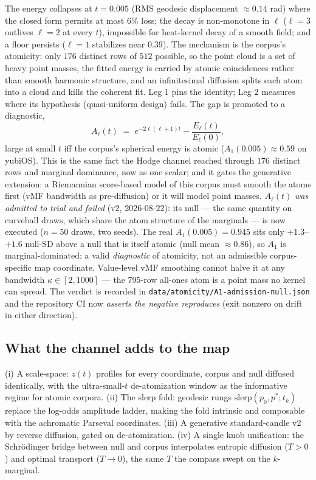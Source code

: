 \documentclass[11pt,a4paper]{article}
\theoremstyle{plain}
\theoremstyle{remark}
\begin{document}
The energy collapses at $t=0.005$ (RMS geodesic displacement ${\approx}0.14$ rad) where the closed form permits at most $6\%$ loss; the decay is non-monotone in $\ell$ ($\ell=3$ outlives $\ell=2$ at every $t$), impossible for heat-kernel decay of a smooth field; and a floor persists ($\ell=1$ stabilizes near $0.39$). The mechanism is the corpus's atomicity: only $176$ distinct rows of $512$ possible, so the point cloud is a set of heavy point masses, the fitted energy is carried by atomic coincidences rather than smooth harmonic structure, and an infinitesimal diffusion splits each atom into a cloud and kills the coherent fit. Leg 1 pins the identity; Leg 2 measures where its hypothesis (quasi-uniform design) fails. The gap is promoted to a diagnostic,
\begin{equation}
A_\ell(t)\;=\;e^{-2\ell(\ell+1)t}-\frac{E_\ell(t)}{E_\ell(0)},\tag{10}
\end{equation}
large at small $t$ iff the corpus's spherical energy is atomic ($A_1(0.005)\approx0.59$ on yubiOS). This is the same fact the Hodge channel reached through $176$ distinct rows and marginal dominance, now as one scalar; and it gates the generative extension: a Riemannian score-based model of this corpus must smooth the atoms first (vMF bandwidth as pre-diffusion) or it will model point masses. $A_\ell(t)$ \emph{was admitted to trial and failed} (v2, 2026-08-22): its null --- the same quantity on curveball draws, which share the atom structure of the marginals --- is now executed ($n{=}50$ draws, two seeds). The real $A_1(0.005)=0.945$ sits only $+1.3$--$+1.6$ null-SD above a null that is itself atomic (null mean $\approx 0.86$), so $A_1$ is marginal-dominated: a valid \emph{diagnostic} of atomicity, not an admissible corpus-specific map coordinate. Value-level vMF smoothing cannot halve it at any bandwidth $\kappa\in[2,1000]$ --- the 795-row all-ones atom is a point mass no kernel can spread. The verdict is recorded in \texttt{data/atomicity/A1-admission-null.json} and the repository CI now \emph{asserts the negative reproduces} (exit nonzero on drift in either direction).

\subsection{What the channel adds to the map}
(i) A scale-space: $z(t)$ profiles for every coordinate, corpus and null diffused identically, with the ultra-small-$t$ de-atomization window as the informative regime for atomic corpora. (ii) The slerp fold: geodesic rungs $\mathrm{slerp}(p_0,p^*;t_k)$ replace the log-odds amplitude ladder, making the fold intrinsic and composable with the achromatic Parseval coordinates. (iii) A generative standard-candle v2 by reverse diffusion, gated on de-atomization. (iv) A single knob unification: the Schr\"odinger bridge between null and corpus interpolates entropic diffusion ($T>0$) and optimal transport ($T\to0$), the same $T$ the compass swept on the $k$-marginal.
\end{document}
